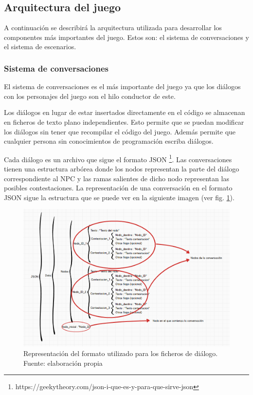 \subsection{Arquitectura del juego}

A continuación se describirá la arquitectura utilizada para desarrollar los componentes más importantes del juego. Estos son: el sistema de conversaciones y el sistema de escenarios. %

\subsubsection{Sistema de conversaciones}

El sistema de conversaciones es el más importante del juego ya que los diálogos con los personajes del juego son el hilo conductor de este.

Los diálogos en lugar de estar insertados directamente en el código se almacenan en ficheros de texto plano independientes. Esto permite que se puedan modificar los diálogos sin tener que recompilar el código del juego. Además permite que cualquier persona sin conocimientos de programación escriba diálogos.

Cada diálogo es un archivo que sigue el formato JSON \footnote{https://geekytheory.com/json-i-que-es-y-para-que-sirve-json}. Las conversaciones tienen una estructura arbórea donde los nodos representan la parte del diálogo correspondiente al NPC y las ramas salientes de dicho nodo representan las posibles contestaciones. La representación de una conversación en el formato JSON sigue la estructura que se puede ver en la siguiente imagen (ver fig. \ref{jsonFormat}).

\begin{figure}
\begin{center}
\includegraphics[scale=0.57]{imagenes/jsonFormat.png}
\caption{Representación del formato utilizado para los ficheros de diálogo. Fuente: elaboración propia}
\label{jsonFormat}
\end{center}
\end{figure}

